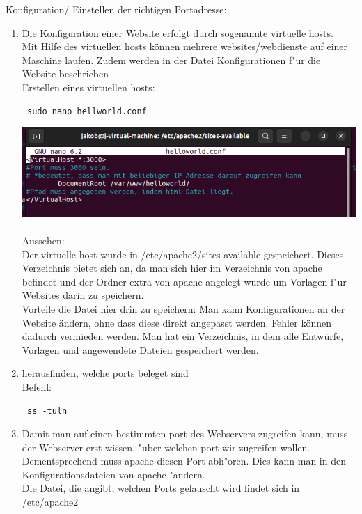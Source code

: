 \documentclass[a4paper,11pt,titlepage]{article}
\begin{document}
\vspace{\baselineskip}
\vspace{\baselineskip}
Konfiguration/ Einstellen der richtigen Portadresse:\\
\begin{enumerate}
\item Die Konfiguration einer Website erfolgt durch sogenannte virtuelle hosts.\\
Mit Hilfe des virtuellen hosts können mehrere websites/webdienste auf einer Maschine laufen. Zudem werden in der Datei Konfigurationen f"ur die Website beschrieben\\
Erstellen eines virtuellen hosts: 
\begin{verbatim} sudo nano hellworld.conf \end{verbatim}
\includegraphics [width = 10 cm] {helloworldConf.png}\\
\\
Aussehen:\\
Der virtuelle host wurde in /etc/apache2/sites-available gespeichert. Dieses Verzeichnis bietet sich an, da man sich hier im Verzeichnis von apache befindet und der Ordner extra von apache angelegt wurde um Vorlagen f"ur Websites darin zu speichern.\\
Vorteile die Datei hier drin zu speichern: Man kann Konfigurationen an der Website ändern, ohne dass diese direkt angepasst werden. Fehler können dadurch vermieden werden. Man hat ein Verzeichnis, in dem alle Entwürfe, Vorlagen und angewendete Dateien gespeichert werden.\\
\item herausfinden, welche ports beleget sind\\
Befehl:
\begin{verbatim} ss -tuln \end{verbatim}
\item Damit man auf einen bestimmten port des Webservers zugreifen kann, muss der Webserver erst wissen, "uber welchen port wir zugreifen wollen. Dementsprechend muss apache diesen Port abh"oren. Dies kann man in den Konfigurationsdateien von apache "andern.\\
Die Datei, die angibt, welchen Ports gelauscht wird findet sich in /etc/apache2

\end{enumerate}
\end{document}
